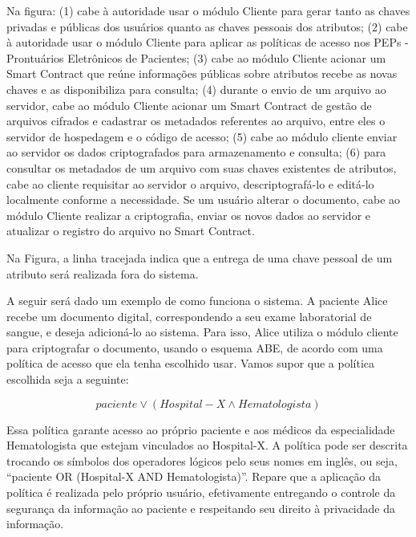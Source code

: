 \documentclass[a4paper,11pt]{article}
\begin{document}
Na figura: (1) cabe à autoridade usar o módulo Cliente para gerar tanto as chaves privadas e públicas dos usuários quanto as chaves pessoais dos atributos;
(2) cabe à autoridade usar o módulo Cliente para aplicar as políticas de acesso nos PEPs - Prontuários Eletrônicos de Pacientes; %
(3) cabe ao módulo Cliente acionar um Smart Contract que reúne informações públicas sobre atributos recebe as novas chaves e as disponibiliza para consulta;
(4) durante o envio de um arquivo ao servidor, cabe ao  módulo Cliente acionar um Smart Contract de gestão de arquivos cifrados e cadastrar os metadados referentes ao arquivo, entre eles o servidor de hospedagem e o código de acesso;
(5) cabe ao módulo cliente enviar ao servidor os dados criptografados para armazenamento e consulta;
(6) para consultar os metadados de um arquivo com suas chaves existentes de atributos, cabe ao cliente requisitar ao servidor o arquivo, descriptografá-lo e editá-lo localmente conforme a necessidade.
Se um usuário alterar o documento, cabe ao módulo Cliente realizar a criptografia, enviar os novos dados ao servidor e atualizar o registro do arquivo no Smart Contract.

Na Figura, a linha tracejada indica que a entrega de uma chave pessoal de um atributo será realizada fora do sistema.

A seguir será dado um exemplo de como funciona o sistema.
A paciente Alice recebe um documento digital, correspondendo a seu exame laboratorial de sangue, e deseja adicioná-lo ao sistema.
Para isso, Alice %
utiliza o módulo cliente para criptografar o documento, usando o esquema ABE, de acordo com uma política de acesso que ela tenha escolhido usar.
Vamos supor que a política escolhida seja a seguinte:

\[paciente \vee (Hospital-X \wedge Hematologista)\]

Essa política garante acesso ao próprio paciente e aos médicos da especialidade Hematologista que estejam vinculados ao Hospital-X. A política pode ser descrita trocando os símbolos dos operadores lógicos pelo seus nomes em inglês, ou seja, ``paciente OR (Hospital-X AND Hematologista)''.
Repare que a aplicação da política é realizada pelo próprio usuário, efetivamente entregando o controle da segurança da informação ao paciente e respeitando seu direito à privacidade da informação.
\end{document}
